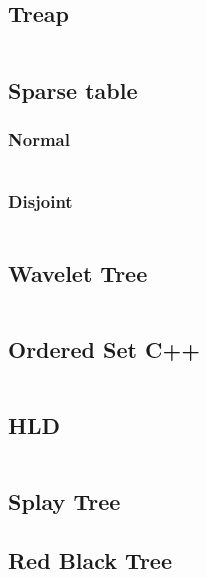 \documentclass[11pt]{article}
\begin{document}
		\subsection{Treap}
		\inputminted[tabsize=2,breaklines,firstline=531,lastline=796,fontsize=\small]{c++}{queries.cpp}
		
		\subsection{Sparse table}
			\subsubsection{Normal}
			\inputminted[tabsize=2,breaklines,firstline=798,lastline=833,fontsize=\small]{c++}{queries.cpp}
		
			\subsubsection{Disjoint}
			\inputminted[tabsize=2,breaklines,firstline=835,lastline=868,fontsize=\small]{c++}{queries.cpp}
			
		\subsection{Wavelet Tree}
		\inputminted[tabsize=2,breaklines,firstline=870,lastline=933,fontsize=\small]{c++}{queries.cpp}
		
		\subsection{Ordered Set C++}
		\inputminted[tabsize=2,breaklines,firstline=935,lastline=969,fontsize=\small]{c++}{queries.cpp}
		
		\subsection{HLD}
		\inputminted[tabsize=2,breaklines,firstline=971,lastline=1037,fontsize=\small]{c++}{queries.cpp}
		
		\subsection{Splay Tree}
		
		
		\subsection{Red Black Tree}
		
\end{document}
